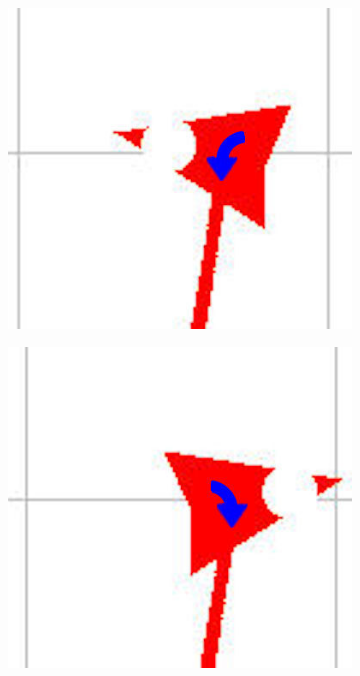 \documentclass[t1]{penoverslag}
\begin{document}
\begin{figure}
\begin{subfigure}[hb]{0.2\textwidth}
        \end{subfigure}%
        \begin{subfigure}[hb]{0.2\textwidth}
                \centering
                \includegraphics[width=\textwidth]{witte_lijn3}
        \end{subfigure}%
        \begin{subfigure}[hb]{0.2\textwidth}
                \centering
                \includegraphics[width=\textwidth]{witte_lijn4}

\end{subfigure}
\end{figure}
\end{document}
